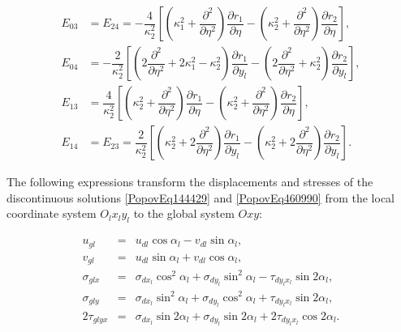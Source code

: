 \begin{align*}
	E_{03} &= E_{24} = -\dfrac{4}{\kappa_2^2} \left[ \left( \kappa_1^2 + \dfrac{\partial^2}{\partial \eta^2} \right) \dfrac{\partial r_1}{\partial \eta} - \left( \kappa_2^2 + \dfrac{\partial^2}{\partial \eta^2} \right) \dfrac{\partial r_2}{\partial \eta} \right],
	\\
	E_{04} &= -\dfrac{2}{\kappa_2^2} \left[ \left( 2\dfrac{\partial^2}{\partial \eta^2} + 2\kappa_1^2 - \kappa_2^2 \right) \dfrac{\partial r_1}{\partial y_l} - \left( 2\dfrac{\partial^2}{\partial \eta^2} + \kappa_2^2 \right) \dfrac{\partial r_2}{\partial y_l} \right],
	\\
	E_{13} &= \dfrac{4}{\kappa_2^2} \left[ \left( \kappa_2^2 + \dfrac{\partial^2}{\partial \eta^2} \right) \dfrac{\partial r_1}{\partial \eta} - \left( \kappa_2^2 + \dfrac{\partial^2}{\partial \eta^2} \right) \dfrac{\partial r_2}{\partial \eta} \right],
	\\
	E_{14} &= E_{23} = \dfrac{2}{\kappa_2^2} \left[ \left( \kappa_2^2 + 2\dfrac{\partial^2}{\partial \eta^2} \right) \dfrac{\partial r_1}{\partial y_l} - \left( \kappa_2^2 + 2\dfrac{\partial^2}{\partial \eta^2} \right) \dfrac{\partial r_2}{\partial y_l} \right].
\end{align*}

The following expressions transform the displacements and stresses of the discontinuous solutions \eqref{PopovEq144429} and \eqref{PopovEq460990} from the local coordinate system \( O_l x_l y_l \) to the global system \( Oxy \):

\begin{equation} \label{PopovEq642436} 
	\begin{array}{rcl}
		u_{gl} &=& u_{dl} \cos \alpha_l - v_{dl} \sin \alpha_l,
		\\
		v_{gl} &=& u_{dl} \sin \alpha_l + v_{dl} \cos \alpha_l,
		\\
		\sigma_{glx} &=& \sigma_{dx_l} \cos^2 \alpha_l + \sigma_{dy_l} \sin^2 \alpha_l - \tau_{dy_l x_l} \sin 2\alpha_l,
		\\
		\sigma_{gly} &=& \sigma_{dx_l} \sin^2 \alpha_l + \sigma_{dy_l} \cos^2 \alpha_l + \tau_{dy_l x_l} \sin 2\alpha_l,
		\\
		2\tau_{glyx} &=& \sigma_{dx_l} \sin 2\alpha_l + \sigma_{dy_l} \sin 2\alpha_l + 2\tau_{dy_l x_l} \cos 2\alpha_l.
	\end{array}
\end{equation}

